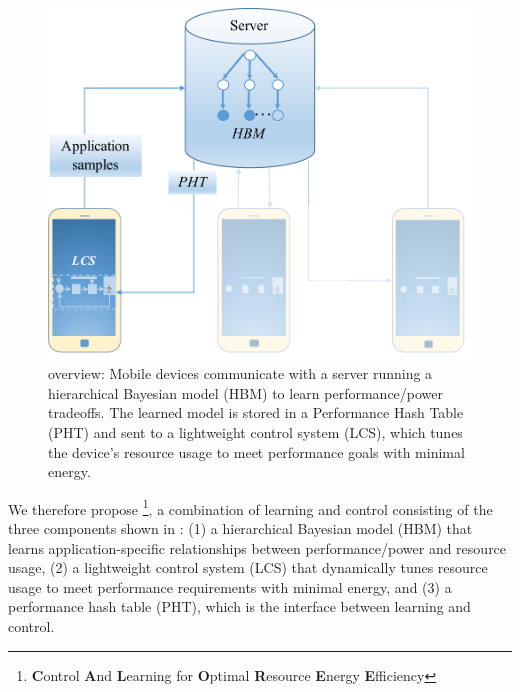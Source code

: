 \begin{figure}
\includegraphics[width=\columnwidth]{figures/mobile-leo-poet2.pdf}
\caption{\SYSTEM{} overview: Mobile devices communicate with a server
  running a hierarchical Bayesian model (HBM) to learn
  performance/power tradeoffs.  The learned model is stored in a
  Performance Hash Table (PHT) and sent to a lightweight control
  system (LCS), which tunes the device's resource usage to meet
  performance goals with minimal energy. }
  \label{fig:overview}
\end{figure}
We therefore propose \SYSTEM{}\footnote{\textbf{C}ontrol \textbf{A}nd
  \textbf{L}earning for \textbf{O}ptimal \textbf{R}esource
  \textbf{E}nergy \textbf{E}fficiency}, a combination of learning and
control consisting of the three components shown in
: (1) a hierarchical Bayesian model (HBM) that
learns application-specific relationships between performance/power
and resource usage, (2) a lightweight control system (LCS) that
dynamically tunes resource usage to meet performance requirements with
minimal energy, and (3) a performance hash table (PHT), which is the
interface between learning and control.  

